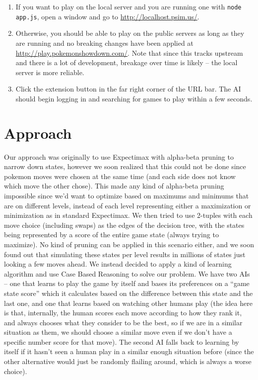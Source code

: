 \documentclass[12pt]{article}
\begin{document}
\begin{enumerate}
  \item If you want to play on the local server and you are running one with \texttt{node app.js}, open a window and go to \url{http://localhost.psim.us/}.
  \item Otherwise, you should be able to play on the public servers as long as they are running and no breaking changes have been applied at \url{http://play.pokemonshowdown.com/}. Note that since this tracks upstream and there is a lot of development, breakage over time is likely -- the local server is more reliable.
  \item Click the extension button in the far right corner of the URL bar. The AI should begin logging in and searching for games to play within a few seconds.
\end{enumerate}

\section{Approach}
Our approach was originally to use Expectimax with alpha-beta pruning to narrow down states, however we soon realized that this could not be done since pokemon moves were chosen at the same time (and each side does not know which move the other chose).  This made any kind of alpha-beta pruning impossible since we'd want to optimize based on maximums and minimums that are on different levels, instead of each level representing either a maximization or minimization as in standard Expectimax.  We then tried to use 2-tuples with each move choice (including swaps) as the edges of the decision tree, with the states being represented by a score of the entire game state (always trying to maximize).  No kind of pruning can be applied in this scenario either, and we soon found out that simulating these states per level results in millions of states just looking a few moves ahead.  We instead decided to apply a kind of learning algorithm and use Case Based Reasoning to solve our problem.  We have two AIs -- one that learns to play the game by itself and bases its preferences on a ``game state score'' which it calculates based on the difference between this state and the last one, and one that learns based on watching other humans play (the idea here is that, internally, the human scores each move according to how they rank it, and always chooses what they consider to be the best, so if we are in a similar situation as them, we should choose a similar move even if we don't have a specific number score for that move).  The second AI falls back to learning by itself if it hasn't seen a human play in a similar enough situation before (since the other alternative would just be randomly flailing around, which is always a worse choice).
\end{document}
